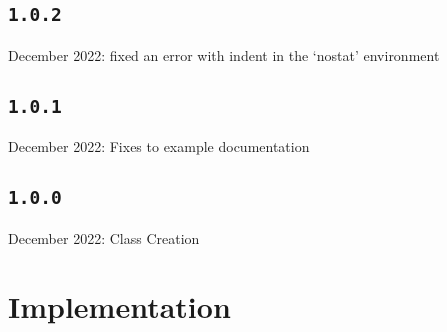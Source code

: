 \documentclass{article}
\begin{document}
		\subsection{\normalfont\texttt{1.0.2}}
 December 2022: fixed an error with indent in the `nostat' environment
\subsection{\normalfont\texttt{1.0.1}}
 December 2022: Fixes to example documentation

\subsection{\normalfont\texttt{1.0.0}}
 December 2022: Class Creation


	\clearpage\section{Implementation}
	
\end{document}
